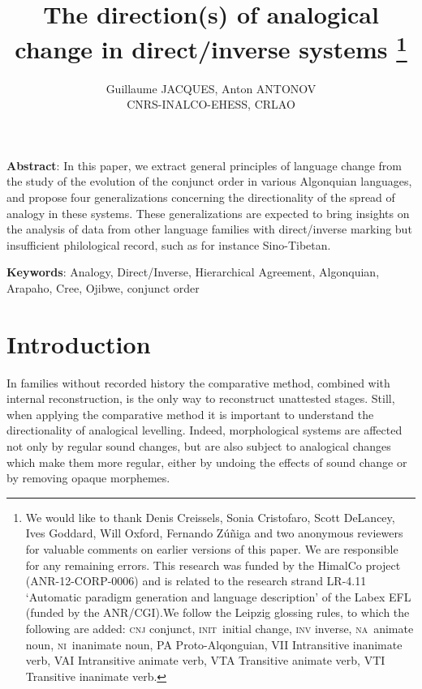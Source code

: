 \documentclass[twoside,a4paper,11pt]{article}
\newcommand{\Σ}{\greek{Σ}}
\newcommand{\init}{\textsc{init}}
\newcommand{\nanim}{\textsc{na}}
\newcommand{\ninan}{\textsc{ni}}
\begin{document}
\title{The direction(s) of analogical change in direct/inverse systems \footnote{We would like to thank Denis Creissels, Sonia Cristofaro, Scott DeLancey, Ives Goddard, Will Oxford, Fernando Zúñiga and two anonymous reviewers for valuable comments on earlier versions of this paper. We are responsible for any remaining errors. This research was funded by the HimalCo project (ANR-12-CORP-0006) and is related to the research strand LR-4.11 `Automatic paradigm generation and language description' of the Labex EFL (funded by the ANR/CGI).We follow the Leipzig glossing rules, to which the following are added: \textsc{cnj} conjunct, \init\ initial change, \textsc{inv} inverse, \nanim\ animate noun, \ninan\ inanimate noun, PA Proto-Alqonguian, VII Intransitive inanimate verb, VAI Intransitive animate verb, VTA Transitive animate verb, VTI Transitive inanimate verb.  } }

\author{Guillaume JACQUES, Anton ANTONOV\\ CNRS-INALCO-EHESS, CRLAO}
\maketitle

\textbf{Abstract}: In this paper, we extract general principles of language change from the study of the evolution of the conjunct order in various Algonquian languages, and propose four generalizations concerning the directionality of the spread of analogy in these systems. These generalizations are expected to bring insights on the analysis of data from other language families with direct/inverse marking but insufficient philological record, such as for instance Sino-Tibetan.

\textbf{Keywords}: Analogy, Direct/Inverse, Hierarchical Agreement, Algonquian, Arapaho, Cree, Ojibwe, conjunct order

 
\section{Introduction}
In families without recorded history the comparative method, combined with internal reconstruction, is the only way to reconstruct unattested stages. Still, when applying the comparative method it is important to understand the directionality of analogical levelling.  Indeed, morphological systems are affected not only by regular sound changes, but are also subject to analogical changes which make them more regular, either by undoing the effects of sound change or by removing opaque morphemes.
\end{document}
